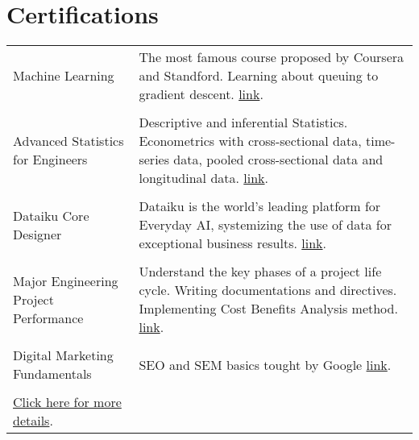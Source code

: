 \documentclass[a4paper,12pt]{article}
\begin{document}
\section{Certifications}
\begin{tabularx}{\linewidth}{@{}l X@{}}
Machine Learning &  \normalsize{The most famous course proposed by Coursera and Standford. Learning about queuing to gradient descent.}
\href{shorturl.at/hyzKV}{link}.\\
\\

Advanced Statistics for Engineers &  \normalsize{ Descriptive and inferential Statistics. Econometrics with cross-sectional data, time-series data, pooled cross-sectional data and longitudinal data.}
\href{https://github.com/Sitraka17/CV_LaTeX}{link}.\\
\\

Dataiku Core Designer &  \normalsize{Dataiku is the world's leading platform for Everyday AI, systemizing the use of data for exceptional business results.}
\href{https://verify.skilljar.com/c/bmbokwj42g8j}{link}.\\
\\

Major Engineering Project Performance &  \normalsize{  Understand the key phases of a project life cycle. Writing documentations and directives. Implementing Cost Benefits Analysis method.}
\href{https://www.coursera.org/account/accomplishments/certificate/JXMFTZMYNFGN}{link}.\\
\\

Digital Marketing Fundamentals &  \normalsize{ SEO and SEM basics tought by Google}
\href{https://www.linkedin.com/in/sitraka-matthieu-
forler/details/certifications/}{link}.\\
\\
\href{https://www.coursera.org/account/accomplishments/certificate/JXMFTZMYNFGN}{Click here for more details}.\\



\end{tabularx}


\vfill
{}
\end{document}
